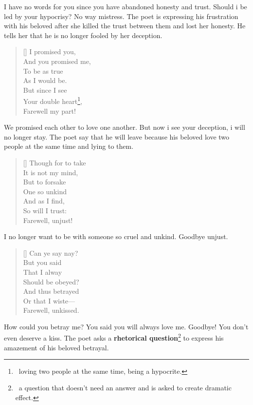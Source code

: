 \documentclass[12pt, a4paper]{article}
\begin{document}
I have no words for you since you have abandoned honesty and trust.
Should i be led by your hypocrisy? No way mistress. The poet is expressing
his frustration with his beloved after she killed the trust between them 
and lost her honesty. He tells her that he is no longer fooled by her 
deception. 

\begin{verse}[\versewidth]
{\fontverse
I promised you,\\
And you promised me,\\
To be as true\\
As I would be.\\
But since I see\\
Your double heart\footnote{\, loving two people at the same time, being a hypocrite.},\\
Farewell my part! 
} 
\end{verse}

We promised each other to love one another. But now i see your 
deception, i will no longer stay. The poet say that he will leave 
because his beloved love two people at the same time and lying to them.

\begin{verse}[\versewidth]
{\fontverse
Though for to take\\
It is not my mind,\\
But to forsake\\
One so unkind \\
And as I find,\\
So will I trust:\\
Farewell, unjust! 
} 
\end{verse}

I no longer want to be with someone so cruel and unkind. Goodbye unjust.


\begin{verse}[\versewidth]
{\fontverse
Can ye say nay?\\
But you said\\
That I alway\\
Should be obeyed?\\
And thus betrayed\\
Or that I wiste—\\
Farewell, unkissed. 
} 
\end{verse}

How could you betray me? You said you will always love me. Goodbye! You don't even deserve a kiss.
The poet asks a \textbf{rhetorical question}\footnote{\, a question that doesn't need an answer and is asked to create dramatic effect.}
to express his amazement of his beloved
betrayal.
\end{document}
